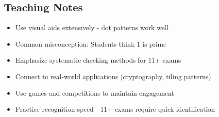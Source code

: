 \documentclass{article}
\begin{document}
\subsection*{Teaching Notes}
\begin{itemize}
    \item Use visual aids extensively - dot patterns work well
    \item Common misconception: Students think 1 is prime
    \item Emphasize systematic checking methods for 11+ exams
    \item Connect to real-world applications (cryptography, tiling patterns)
    \item Use games and competitions to maintain engagement
\item Practice recognition speed - 11+ exams require quick identification
\end{itemize}
\end{document}
